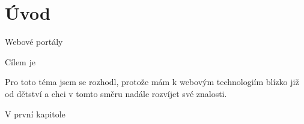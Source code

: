 \chapter{Úvod}
Webové portály \blindtext

Cílem je \blindtext

Pro toto téma jsem se rozhodl, protože mám k webovým technologiím blízko již od dětství a chci v tomto směru nadále rozvíjet své znalosti.

V první kapitole \blindtext